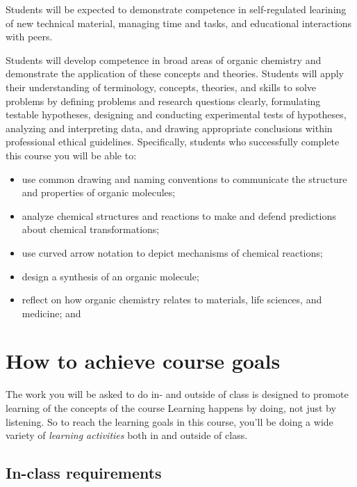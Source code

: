 Students will be expected to demonstrate competence in self-regulated
learining of new technical material, managing time and tasks, and
educational interactions with peers.

Students will develop competence in broad areas of organic chemistry and
demonstrate the application of these concepts and theories. Students
will apply their understanding of terminology, concepts, theories, and
skills to solve problems by defining problems and research questions
clearly, formulating testable hypotheses, designing and conducting
experimental tests of hypotheses, analyzing and interpreting data, and
drawing appropriate conclusions within professional ethical guidelines.
Specifically, students who successfully complete this course you will be
able to:

\begin{itemize}
\tightlist
\item
  use common drawing and naming conventions to communicate the structure
  and properties of organic molecules;
\item
  analyze chemical structures and reactions to make and defend
  predictions about chemical transformations;
\item
  use curved arrow notation to depict mechanisms of chemical reactions;
\item
  design a synthesis of an organic molecule;
\item
  reflect on how organic chemistry relates to materials, life sciences,
  and medicine; and
\end{itemize}

\hypertarget{how-to-achieve-course-goals}{%
\section{How to achieve course
goals}\label{how-to-achieve-course-goals}}

The work you will be asked to do in- and outside of class is designed to
promote learning of the concepts of the course Learning happens by
doing, not just by listening. So to reach the learning goals in this
course, you'll be doing a wide variety of \emph{learning activities}
both in and outside of class.

\hypertarget{in-class-requirements}{%
\subsection{In-class requirements}\label{in-class-requirements}}

